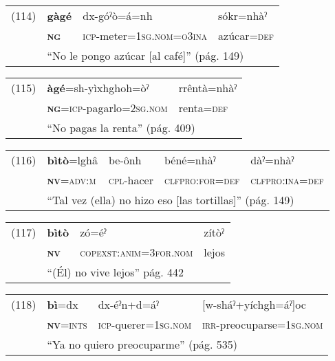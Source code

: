 {\setmainfont{Charis SIL} 

\begin{tabular}{llll}
(114) & \textbf{gàgé} & dx-góˀò=á=nh & sókr=nhàˀ \\
& \textsc{\textbf{ng}} & \textsc{icp-}meter=\textsc{1sg.nom=o3ina} & azúcar=\textsc{def} \\
& \multicolumn{3}{l}{``No le pongo azúcar [al café]'' (pág. 149)}
\end{tabular} \vspace{0.5cm}

\begin{tabular}{lll}
(115) & \textbf{àgé}=sh-yìxhghoh=òˀ & rrêntà=nhàˀ \\
& \textsc{\textbf{ng}=icp-}pagarlo\textsc{=2sg.nom} & renta=\textsc{def} \\
& \multicolumn{2}{l}{``No pagas la renta'' (pág. 409)}
\end{tabular} \vspace{0.3cm}

\begin{tabular}{lllll}
(116) & \textbf{bìtò}=lghâ & be-ônh & béné=nhàˀ & dàˀ=nhàˀ \\
& \textsc{\textbf{nv}=adv:m} & \textsc{cpl-}hacer & \textsc{clfpro:for=def} & \textsc{clfpro:ina=def} \\
& \multicolumn{4}{l}{``Tal vez (ella) no hizo eso [las tortillas]'' (pág. 149)}
\end{tabular} \vspace{0.3cm}

\begin{tabular}{llll}
(117) & \textbf{bìtò} & zó=éˀ & zítòˀ \\
& \textsc{\textbf{nv}} & \textsc{copexst:anim=3for.nom} & lejos \\
& \multicolumn{3}{l}{``(Él) no vive lejos'' pág. 442}
\end{tabular} \vspace{0.3cm}

\begin{tabular}{llll}
(118) & \textbf{bì}=dx & dx-éˀn+d=áˀ & [w-sháˀ+yíchgh=áˀ]oc \\
& \textsc{\textbf{nv}=ints} & \textsc{icp-}querer=\textsc{1sg.nom} & \textsc{irr-}preocuparse=\textsc{1sg.nom} \\
& \multicolumn{3}{l}{``Ya no quiero preocuparme'' (pág. 535)}
\end{tabular} \vspace{0.3cm}

}

